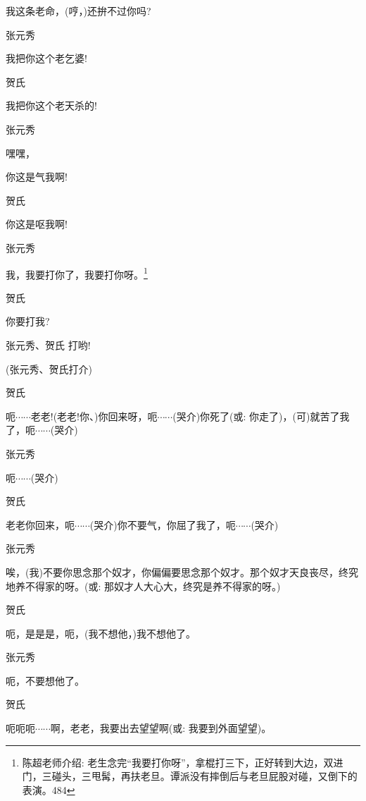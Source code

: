 我这条老命，(哼，)还拚不过你吗?

张元秀\hspace{20pt}~

我把你这个老乞婆!

贺氏\hspace{30pt}~

我把你这个老天杀的!

张元秀\hspace{20pt}~

嘿嘿，

你这是气我啊!

贺氏\hspace{30pt}~

你这是呕我啊!

张元秀

我，我要打你了，我要打你呀。\footnote{ 陈超老师介绍: 老生念完``我要打你呀''，拿棍打三下，正好转到大边，双进门，三碰头，三甩髯，再扶老旦。{谭派没有摔倒后与老旦屁股对碰}，{又倒下的表演}。{484}}

贺氏\hspace{30pt}~

你要打我?

张元秀、贺氏 打哟!

(张元秀、贺氏打介)

贺氏

呃$\cdots{}\cdots{}$老老!(老老!你、)你回来呀，呃$\cdots{}\cdots{}$(哭介)你死了({\akai 或}: 你走了)，(可)就苦了我了，呃$\cdots{}\cdots{}$(哭介)

张元秀\hspace{20pt}~

呃$\cdots{}\cdots{}$(哭介)

贺氏

老老你回来，呃$\cdots{}\cdots{}$(哭介)你不要气，你屈了我了，呃$\cdots{}\cdots{}$(哭介)

张元秀

唉，(我)不要你思念那个奴才，你偏偏要思念那个奴才。那个奴才天良丧尽，终究地养不得家的呀。({\akai 或}: 那奴才人大心大，终究是养不得家的呀。)

贺氏\hspace{30pt}~

呃，是是是，呃，(我不想他，)我不想他了。

张元秀\hspace{20pt}~

呃，不要想他了。

贺氏

呃呃呃$\cdots{}\cdots{}$啊，老老，我要出去望望啊({\akai 或}: 我要到外面望望)。

